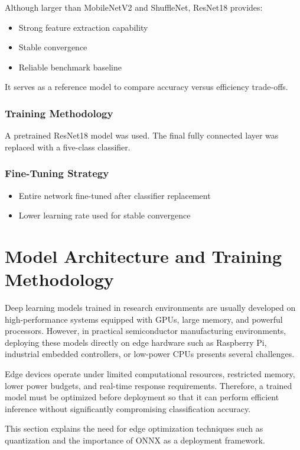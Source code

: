 Although larger than MobileNetV2 and ShuffleNet, ResNet18 provides:
\begin{itemize}
\item Strong feature extraction capability
\item Stable convergence
\item Reliable benchmark baseline
\end{itemize}
It serves as a reference model to compare accuracy versus efficiency trade-offs.

\subsubsection{Training Methodology}

A pretrained ResNet18 model was used. The final fully connected layer was replaced with a five-class classifier.

\subsubsection{Fine-Tuning Strategy}
\begin{itemize}
\item Entire network fine-tuned after classifier replacement
\item Lower learning rate used for stable convergence
\end{itemize}

\section{Model Architecture and Training Methodology}
Deep learning models trained in research environments are usually developed on high-performance systems equipped with GPUs, large memory, and powerful processors. However, in practical semiconductor manufacturing environments, deploying these models directly on edge hardware such as Raspberry Pi, industrial embedded controllers, or low-power CPUs presents several challenges.

Edge devices operate under limited computational resources, restricted memory, lower power budgets, and real-time response requirements. Therefore, a trained model must be optimized before deployment so that it can perform efficient inference without significantly compromising classification accuracy.

This section explains the need for edge optimization techniques such as quantization and the importance of ONNX as a deployment framework.

